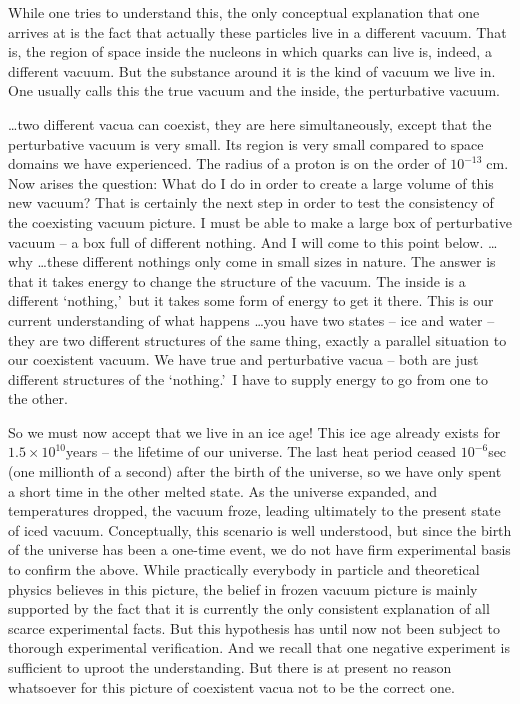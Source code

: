 \begin{mdframed}[linecolor=gray,roundcorner=12pt,backgroundcolor=Dandelion!15,linewidth=1pt,leftmargin=0cm,rightmargin=0cm,topline=true,bottomline=true,skipabove=12pt]
While one tries to understand this, the only conceptual explanation that one arrives at is the fact that actually these particles live in a different vacuum. That is, the region of space inside the nucleons in which quarks can live is, indeed, a different vacuum. But the substance around it is the kind of vacuum we live in. One usually calls this the true vacuum and the inside, the perturbative vacuum.

\ldots two different vacua can coexist, they are here simultaneously, except that the perturbative vacuum is very small. Its region is very small compared to space domains we have experienced. The radius of a proton is on the order of $10^{-13}\;$cm. Now arises the question: What do I do in order to create a large volume of this new vacuum? That is certainly the next step in order to test the consistency of the coexisting vacuum picture. I must be able to make a large box of perturbative vacuum -- a box full of different nothing. And I will come to this point below.
%
\ldots why \ldots these different nothings only come in small sizes in nature. The answer is that it takes energy to change the structure of the vacuum. The inside is a different \lq nothing,\rq\ but it takes some form of energy to get it there. This is our current understanding of what happens
\ldots you have two states -- ice and water -- they are two different structures of the same thing, exactly a parallel situation to our coexistent vacuum. We have true and perturbative vacua -- both are just different structures of the \lq nothing.\rq\ I have to supply energy to go from one to the other. 

So we must now accept that we live in an ice age! This ice age already exists for $1.5\times 10^{10}$\;years -- the lifetime of our universe. The last heat period ceased $10^{-6}$\;sec (one millionth of a second) after the birth of the universe, so we have only spent a short time in the other melted state. As the universe expanded, and temperatures dropped, the vacuum froze, leading ultimately to the present state of iced vacuum. Conceptually, this scenario is well understood, but since the birth of the universe has been a one-time event, we do not have firm experimental basis to confirm the above. While practically everybody in particle and theoretical physics believes in this picture, the belief in frozen vacuum picture is mainly supported by the fact that it is currently the only consistent explanation of all scarce experimental facts. But this hypothesis has until now not been subject to thorough experimental verification. And we recall that one negative experiment is sufficient to uproot the understanding. But there is at present no reason whatsoever for this picture of coexistent vacua not to be the correct one.


\end{mdframed}
